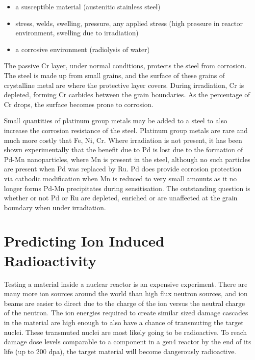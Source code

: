 \begin{itemize}
\item a susceptible material (austenitic stainless steel)
\item stress, welds, swelling, pressure, any applied stress (high pressure in reactor environment, swelling due to irradiation)
\item a corrosive environment (radiolysis of water)
\end{itemize}

The passive Cr layer, under normal conditions, protects the steel from corrosion.  The steel is made up from small grains, and the surface of these grains of crystalline metal are where the protective layer covers.  During irradiation, Cr is depleted, forming Cr carbides between the grain boundaries.  As the percentage of Cr drops, the surface becomes prone to corrosion.

Small quantities of platinum group metals may be added to a steel to also increase the corrosion resistance of the steel.  Platinum group metals are rare and much more costly that Fe, Ni, Cr.  Where irradiation is not present, it has been shown experimentally that the benefit due to Pd is lost due to the formation of Pd-Mn nanoparticles, where Mn is present in the steel, although no such particles are present when Pd was replaced by Ru.  Pd does provide corrosion protection via cathodic modification when Mn is reduced to very small amounts as it no longer forms Pd-Mn precipitates during sensitisation.  The outstanding question is whether or not Pd or Ru are depleted, enriched or are unaffected at the grain boundary when under irradiation.




\section{Predicting Ion Induced Radioactivity}

Testing a material inside a nuclear reactor is an expensive experiment.  There are many more ion sources around the world than high flux neutron sources, and ion beams are easier to direct due to the charge of the ion versus the neutral charge of the neutron.  The ion energies required to create similar sized damage cascades in the material are high enough to also have a chance of transmuting the target nuclei.  These transmuted nuclei are most likely going to be radioactive.  To reach damage dose levels comparable to a component in a \acrshort{gen4} reactor by the end of its life (up to 200 \acrshort{dpa}), the target material will become dangerously radioactive. 


